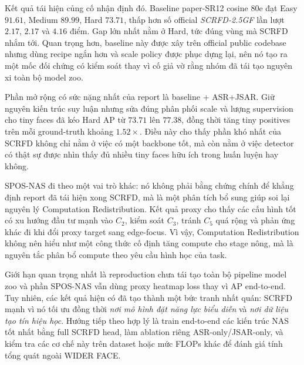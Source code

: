 Kết quả tái hiện củng cố nhận định đó. Baseline paper-SR12 cosine 80e đạt Easy \(91.61\), Medium \(89.99\), Hard \(73.71\), thấp hơn số official \textit{SCRFD-2.5GF} lần lượt \(2.17\), \(2.17\) và \(4.16\) điểm. Gap lớn nhất nằm ở Hard, tức đúng vùng mà SCRFD nhắm tới. Quan trọng hơn, baseline này được xây trên official public codebase nhưng dùng recipe ngắn hơn và scale policy được phục dựng lại, nên nó tạo ra một mốc đối chứng có kiểm soát thay vì cố giả vờ rằng nhóm đã tái tạo nguyên xi toàn bộ model zoo.

Phần mở rộng có sức nặng nhất của report là baseline + ASR+JSAR. Giữ nguyên kiến trúc suy luận nhưng sửa đúng phân phối scale và lượng supervision cho tiny faces đã kéo Hard AP từ \(73.71\) lên \(77.38\), đồng thời tăng tiny positives trên mỗi ground-truth khoảng \(1.52\times\). Điều này cho thấy phần khó nhất của SCRFD không chỉ nằm ở việc có một backbone tốt, mà còn nằm ở việc detector có thật sự được nhìn thấy đủ nhiều tiny faces hữu ích trong huấn luyện hay không.

SPOS-NAS đi theo một vai trò khác: nó không phải bằng chứng chính để khẳng định report đã tái hiện xong SCRFD, mà là một phân tích bổ sung giúp soi lại nguyên lý Computation Redistribution. Kết quả proxy cho thấy các cấu hình tốt có xu hướng đầu tư mạnh vào \(C_2\), kiểm soát \(C_3\), tránh \(C_5\) quá rộng và phản ứng khác đi khi đổi proxy target sang edge-focus. Vì vậy, Computation Redistribution không nên hiểu như một công thức cố định tăng compute cho stage nông, mà là nguyên tắc phân bổ compute theo yêu cầu hình học của task.

Giới hạn quan trọng nhất là reproduction chưa tái tạo toàn bộ pipeline model zoo và phần SPOS-NAS vẫn dùng proxy heatmap loss thay vì AP end-to-end. Tuy nhiên, các kết quả hiện có đã tạo thành một bức tranh nhất quán: SCRFD mạnh vì nó tối ưu đồng thời \textit{nơi mô hình đặt năng lực biểu diễn} và \textit{nơi dữ liệu tạo tín hiệu học}. Hướng tiếp theo hợp lý là train end-to-end các kiến trúc NAS tốt nhất bằng full SCRFD head, làm ablation riêng ASR-only/JSAR-only, và kiểm tra các cơ chế này trên dataset hoặc mức FLOPs khác để đánh giá tính tổng quát ngoài WIDER FACE.


